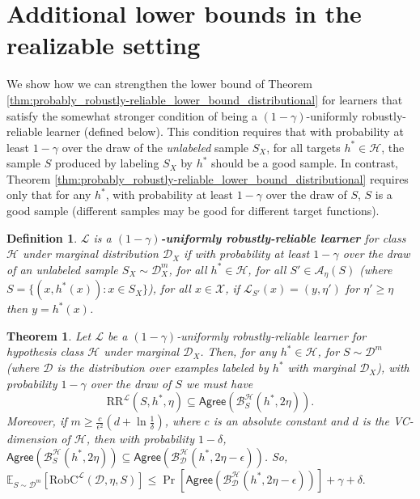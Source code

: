 \documentclass[11pt]{article}
\newcommand{\CR}{\text{RR}}
\newtheorem{theorem}{Theorem}[section]
\newtheorem{definition}{Definition}
\newcommand{\0}{\mathbf{0}}
\newcommand{\1}{\mathbf{1}}
\newcommand{\cA}{\mathcal{A}}
\newcommand{\cB}{\mathcal{B}}
\newcommand{\cD}{\mathcal{D}}
\newcommand{\cH}{\mathcal{H}}
\newcommand{\cL}{\mathcal{L}}
\newcommand{\cX}{\mathcal{X}}
\newcommand{\bbE}{\mathbb{E}}
\newcommand{\Agree}{\mathsf{Agree}}
\begin{document}



\appendix

\section{Additional lower bounds in the realizable setting}
\label{sec:additional}



We show how we can strengthen the lower bound of Theorem \ref{thm:probably_robustly-reliable_lower_bound_distributional} for learners that satisfy the somewhat stronger condition of being a $(1-\gamma)$-uniformly robustly-reliable learner (defined below).  This condition requires that with probability at least $1-\gamma$ over the draw of the {\em unlabeled} sample $S_X$, for all targets $h^* \in \cH$, the sample $S$ produced by labeling $S_X$ by $h^*$ should be a good sample.  In contrast, Theorem \ref{thm:probably_robustly-reliable_lower_bound_distributional} requires only that for any $h^*$, with probability at least $1-\gamma$ over the draw of $S$, $S$ is a good sample (different samples may be good for different target functions).

\begin{definition}
$\cL$ is a {\bf $(1-\gamma)$-uniformly robustly-reliable learner} for class $\cH$ under marginal distribution $\cD_X$ if with probability at least $1-\gamma$ over the draw of an unlabeled sample $S_X \sim \cD_X^m$, for all $h^* \in \cH$, for all $S' \in \cA_\eta(S)$ (where $S=\{(x,h^*(x)) : x\in S_X\}$), for all $x \in \cX$, if $\cL_{S'}(x) = (y,\eta')$ for $\eta' \geq \eta$ then $y=h^*(x)$.
\end{definition}

\begin{theorem}
Let $\cL$ be a $(1-\gamma)$-uniformly robustly-reliable learner for hypothesis class $\cH$ under marginal $\cD_X$. Then, for any $h^*\in\cH$, for $S \sim \cD^m$ (where $\cD$ is the distribution over examples labeled by $h^*$ with marginal $\cD_X$), with probability $1-\gamma$ over the draw of $S$ we must have
$$\CR^\cL(S,h^*,\eta) \subseteq \Agree\left(\cB_S^\cH(h^*,2\eta)\right).$$
Moreover, if $m\geq \frac{c}{\epsilon^2}(d+\ln\frac{1}{\delta})$, where $c$ is an absolute constant and $d$ is the VC-dimension of $\cH$, then with probability $1-\delta$, $\Agree(\cB_S^\cH(h^*,2\eta)) \subseteq \Agree(\cB_\cD^\cH(h^*,2\eta-\epsilon))$. So, $\bbE_{S\sim\cD^m}[\text{RobC}^\cL(\cD,\eta,S)]\le \Pr[\Agree(\cB_\cD^\cH(h^*,2\eta-\epsilon))]+\gamma+\delta.$
\label{thm:probably_robustly-reliable_lower_bound_sample}
\end{theorem}
\end{document}
